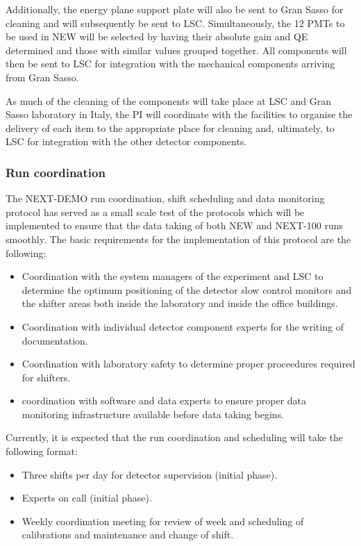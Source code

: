 \documentclass[a4paper,11pt,oneside]{article}
\begin{document}
Additionally, the energy plane support plate will also be sent to Gran
Sasso for cleaning and will subsequently be sent to
LSC. Simultaneously, the 12 PMTs to be used in NEW will be selected by
having their absolute gain and QE determined and those with similar
values grouped together. All components will then be sent to LSC for
integration with the mechanical components arriving from Gran Sasso.

As much of the cleaning of the components will take place at LSC and Gran Sasso
laboratory in Italy, the PI will coordinate with the facilities to
organise the delivery of each item to the appropriate place for
cleaning and, ultimately, to LSC for integration with the other
detector components.

\subsubsection*{Run coordination}
The NEXT-DEMO run coordination, shift scheduling and data monitoring
protocol has served as a small scale test of the protocols which will
be implemented to ensure that the data taking of both NEW and NEXT-100
runs smoothly. The basic requirements for the implementation of this
protocol are the following:
\begin{itemize}
\item Coordination with the system managers of the experiment and LSC
  to determine the optimum positioning of the detector slow control
  monitors and the shifter areas both inside the laboratory and inside
  the office buildings.
\item Coordination with individual detector component experts for the
  writing of documentation.
\item Coordination with laboratory safety to determine proper
  proceedures required for shifters.
\item coordination with software and data experts to ensure proper
  data monitoring infrastructure available before data taking begins.
\end{itemize}
Currently, it is expected that the run coordination and scheduling
will take the following format:
\begin{itemize}
\item Three shifts per day for detector supervision (initial phase).
\item Experts on call (initial phase).
\item Weekly coordination meeting for review of week and scheduling of
  calibrations and maintenance and change of shift.
\end{itemize}
\end{document}

